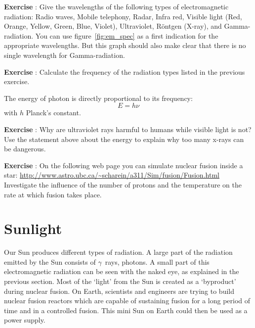 \documentclass[12pt,a4paper]{article}
\numberwithin{equation}{section}
\numberwithin{figure}{section}
\newcounter{Exercise}
\numberwithin{table}{section}
\begin{document}
\begin{shaded}
\textbf{Exercise \theExercise {}} : Give the wavelengths of the following types of electromagnetic radiation: Radio waves, Mobile telephony, Radar, Infra red, Visible light (Red, Orange, Yellow, Green, Blue, Violet), Ultraviolet, R\"ontgen (X-ray), and Gamma-radiation. You can use figure~\ref{fig:em_spec} as a first indication for the appropriate wavelengths. But this graph should also make clear that there is no single wavelength for Gamma-radiation.\end{shaded}
\begin{shaded}
\textbf{Exercise \theExercise {}} : Calculate the frequency of the radiation types listed in the previous exercise.\end{shaded}
The energy of photon is directly proportional to its frequency:
\begin{equation}
E=h\nu
\end{equation}
with $h$ Planck's constant. 
\begin{shaded}
\textbf{Exercise \theExercise {}} : Why are ultraviolet rays harmful to humans while visible light is not? Use the statement above about the energy to explain why too many x-rays can be dangerous. \end{shaded}
\begin{shaded}
\textbf{Exercise \theExercise {}} : On the following web page you can simulate nuclear fusion inside a star: \url{http://www.astro.ubc.ca/~scharein/a311/Sim/fusion/Fusion.html}\\ Investigate the influence of the number of protons and the temperature on the rate at which fusion takes place. \end{shaded}

\section{Sunlight}
Our Sun produces different types of radiation. A large part of the radiation emitted by the Sun consists of $\gamma$~rays, photons. A small part of this electromagnetic radiation can be seen with the naked eye, as explained in the previous section. Most of the `light' from the Sun is created as a `byproduct' during nuclear fusion. On Earth, scientists and engineers are trying to build nuclear fusion reactors which are capable of sustaining fusion for a long period of time and in a controlled fusion. This mini Sun on Earth could then be used as a power supply.
\end{document}
